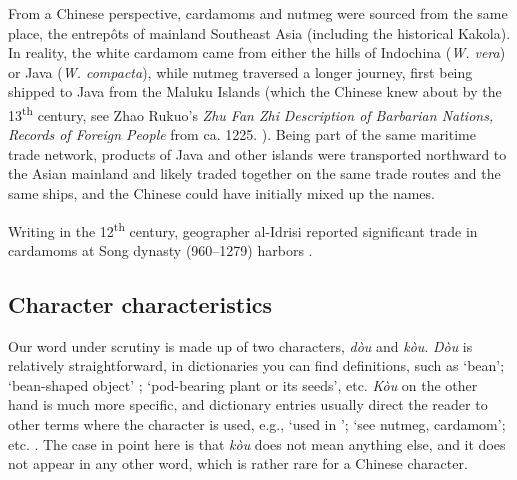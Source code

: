 \documentclass[12pt]{article}
\newcommand{\tc}[1]{\traditionalchinesefont{#1}\rmfamily}
\begin{document}

From a Chinese perspective, cardamoms and nutmeg were sourced from the same place, the entrepôts of mainland Southeast Asia (including the historical Kakola). In reality, the white cardamom came from either the hills of Indochina (\textit{W. vera}) or Java (\textit{W. compacta}), while nutmeg traversed a longer journey, first being shipped to Java from the Maluku Islands (which the Chinese knew about by the 13\textsuperscript{th} century, see Zhao Rukuo's \tc{諸蕃誌} \textit{Zhu Fan Zhi} \textit{Description of Barbarian Nations, Records of Foreign People} from ca. 1225. \parencite[210]{hirth_1911_chau}). Being part of the same maritime trade network, products of Java and other islands were transported northward to the Asian mainland and likely traded together on the same trade routes and the same ships, and the Chinese could have initially mixed up the names.


Writing in the 12\textsuperscript{th} century, geographer al-Idrisi reported significant trade in cardamoms at Song dynasty (960--1279) harbors \parencite{prance_2005_cultural}.



\subsection{Character characteristics}

Our word under scrutiny is made up of two characters, \tc{豆} \textit{dòu} and \tc{蔻} \textit{kòu}. \textit{Dòu} is relatively straightforward, in dictionaries you can find definitions, such as `bean'; `bean-shaped object' \parencite[179]{kleeman_2010_oxford}; `pod-bearing plant or its seeds', etc. \textit{Kòu} on the other hand is much more specific, and dictionary entries usually direct the reader to other terms where the character is used, e.g., `used in \tc{豆蔻}'; `see \tc{豆蔻} nutmeg, cardamom'; etc. \parencite{mdbg}. The case in point here is that \textit{kòu} does not mean anything else, and it does not appear in any other word, which is rather rare for a Chinese character.
\end{document}

